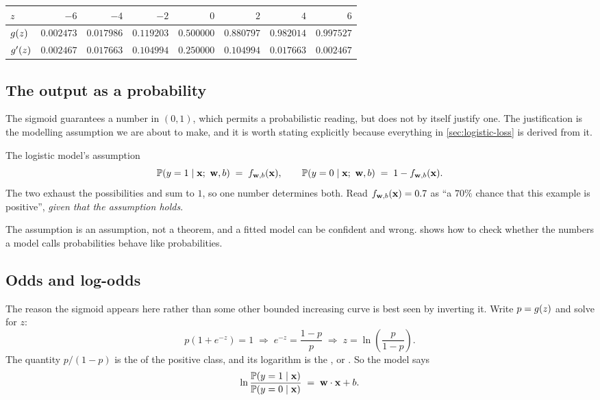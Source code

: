 \begin{center}
\footnotesize
\setlength{\tabcolsep}{4pt}
\renewcommand{\arraystretch}{1.15}
\begin{tabular}{@{}l*{7}{r}@{}}
\toprule
$z$        & $-6$ & $-4$ & $-2$ & $0$ & $2$ & $4$ & $6$\\
\midrule
$g(z)$  & $0.002473$ & $0.017986$ & $0.119203$ & $0.500000$
            & $0.880797$ & $0.982014$ & $0.997527$\\
$g'(z)$ & $0.002467$ & $0.017663$ & $0.104994$ & $0.250000$
            & $0.104994$ & $0.017663$ & $0.002467$\\
\bottomrule
\end{tabular}
\end{center}

\subsection{The output as a probability}

The sigmoid guarantees a number in $(0,1)$, which permits a probabilistic
reading, but does not by itself justify one. The justification is the modelling
assumption we are about to make, and it is worth stating explicitly because
everything in \cref{sec:logistic-loss} is derived from it.

\begin{defbox}{The logistic model's assumption}
\[
  \mathbb{P}(y = 1 \mid \mathbf{x};\ \mathbf{w},b) \;=\; f_{\mathbf{w},b}(\mathbf{x}),
  \qquad
  \mathbb{P}(y = 0 \mid \mathbf{x};\ \mathbf{w},b) \;=\; 1 - f_{\mathbf{w},b}(\mathbf{x}).
\]
The two exhaust the possibilities and sum to $1$, so one number determines both.
Read $f_{\mathbf{w},b}(\mathbf{x}) = 0.7$ as ``a $70\%$ chance that this example is positive'',
\emph{given that the assumption holds}.
\end{defbox}

The assumption is an assumption, not a theorem, and a fitted model can be
confident and wrong.  shows how to check whether the numbers a
model calls probabilities behave like probabilities.

\subsection{Odds and log-odds}

The reason the sigmoid appears here rather than some other bounded increasing
curve is best seen by inverting it. Write $p = g(z)$ and solve for $z$:
\[
  p(1+e^{-z}) = 1 \;\Longrightarrow\;
  e^{-z} = \frac{1-p}{p} \;\Longrightarrow\;
  z = \ln\!\left(\frac{p}{1-p}\right).
\]
The quantity $p/(1-p)$ is the  of the positive class, and its
logarithm is the , or . So the model says
\[
  \ln\frac{\mathbb{P}(y=1\mid\mathbf{x})}{\mathbb{P}(y=0\mid\mathbf{x})} \;=\; \mathbf{w}\cdot\mathbf{x} + b .
\]

